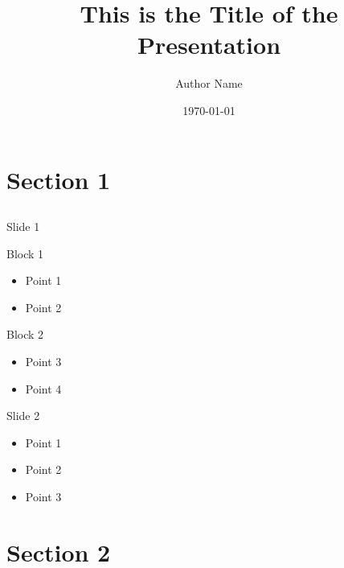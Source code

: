 \documentclass{beamer}
\author{Author Name}
\date{\today}
\title{This is the Title of the Presentation}
\begin{document}
\section{Section 1}
\subsection{}

\begin{frame}\begin{center}
\maketitle
\end{center}\end{frame}

\begin{frame}{Slide 1}\begin{center}
\begin{block}{Block 1}
\begin{itemize}
\item Point 1
\item Point 2
\end{itemize}
\end{block}
\begin{block}{Block 2}
\begin{itemize}
\item Point 3
\item Point 4
\end{itemize}
\end{block}
\end{center}\end{frame}

\begin{frame}{Slide 2}\begin{center}
\begin{itemize}
\item Point 1
\item Point 2
\item Point 3
\end{itemize}
\end{center}\end{frame}

\section{Section 2}
\subsection{}
\end{document}

